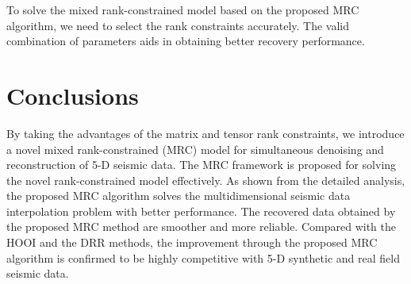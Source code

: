 
To solve the mixed rank-constrained model based on the proposed MRC algorithm, we need to select the rank constraints accurately. The valid combination of parameters aids in obtaining better recovery performance. 

\section{Conclusions}
By taking the advantages of the matrix and tensor rank constraints, we introduce a novel mixed rank-constrained (MRC) model for simultaneous denoising and reconstruction of 5-D seismic data. The MRC framework is proposed for solving the novel rank-constrained model effectively. As shown from the detailed analysis, the proposed MRC algorithm solves the multidimensional seismic data interpolation problem with better performance. The recovered data obtained by the proposed MRC method are smoother and more reliable. Compared with the HOOI and the DRR methods, the improvement through the proposed MRC algorithm is confirmed to be highly competitive with 5-D synthetic and real field seismic data.



